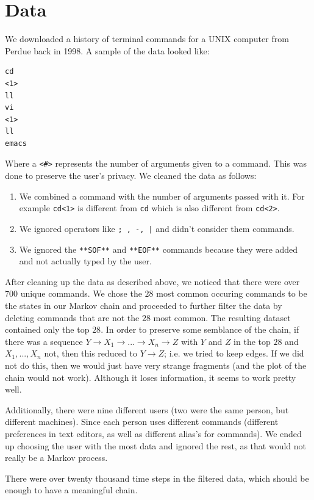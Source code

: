 \documentclass[10pt]{article}
\begin{document}
\section{Data}
We downloaded a history of terminal commands for a UNIX computer from Perdue
back in 1998. A sample of the data looked like:
\begin{verbatim}
cd
<1>
ll
vi
<1>
ll
emacs
\end{verbatim}

Where a \texttt{<\#>} represents the number of arguments given to a command.
This was done to preserve the user's privacy. We cleaned the data as follows:
\begin{enumerate}
  \item We combined a command with the number of arguments passed with it. For
    example \texttt{cd<1>} is different from \texttt{cd} which is also different
    from \texttt{cd<2>}.
  \item We ignored operators like \texttt{; , -, |} and didn't consider them
    commands.
  \item We ignored the \texttt{**SOF**} and \texttt{**EOF**} commands because
    they were added and not actually typed by the user.
\end{enumerate}

After cleaning up the data as described above, we noticed that there were over
$700$ unique commands. We chose the $28$ most common occuring commands to be the
states in our Markov chain and proceeded to further filter the data by deleting
commands that are not the $28$ most common. The resulting dataset contained only
the top $28$. In order to preserve some semblance of the chain, if there was a
sequence $Y \rightarrow X_1 \rightarrow ... \rightarrow X_n \rightarrow Z$ with $Y$ and $Z$ in the top $28$ and $X_1, ..., X_n$ not, then this reduced to
$Y \rightarrow Z$; i.e. we tried to keep edges. If we did not do this, then we would just have very strange fragments (and the plot of the chain would not work).
Although it loses information, it seems to work pretty well.

Additionally, there were nine different users (two were the same person, but different machines).
Since each person uses different commands (different preferences in text editors,
as well as different alias's for commands). We ended up choosing the user with the most
data and ignored the rest, as that would not really be a Markov process.

There were over twenty thousand time steps in the filtered data, which should be enough to have a meaningful chain.
\end{document}
